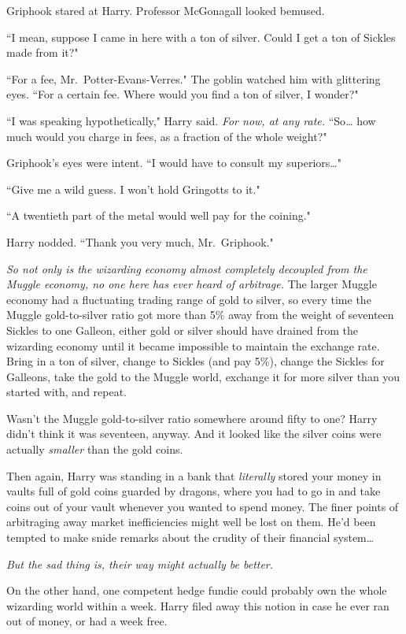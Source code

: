 Griphook stared at Harry. Professor McGonagall looked bemused.

``I mean, suppose I came in here with a ton of silver. Could I get a ton of Sickles made from it?"

``For a fee, Mr.~Potter-Evans-Verres." The goblin watched him with glittering eyes. ``For a certain fee. Where would you find a ton of silver, I wonder?"

``I was speaking hypothetically," Harry said. \emph{For now, at any rate.} ``So{\ldots} how much would you charge in fees, as a fraction of the whole weight?"

Griphook's eyes were intent. ``I would have to consult my superiors{\ldots}"

``Give me a wild guess. I won't hold Gringotts to it."

``A twentieth part of the metal would well pay for the coining."

Harry nodded. ``Thank you very much, Mr.~Griphook."

\emph{So not only is the wizarding economy almost completely decoupled from the Muggle economy, no one here has ever heard of arbitrage.} The larger Muggle economy had a fluctuating trading range of gold to silver, so every time the Muggle gold-to-silver ratio got more than 5\% away from the weight of seventeen Sickles to one Galleon, either gold or silver should have drained from the wizarding economy until it became impossible to maintain the exchange rate. Bring in a ton of silver, change to Sickles (and pay 5\%), change the Sickles for Galleons, take the gold to the Muggle world, exchange it for more silver than you started with, and repeat.

Wasn't the Muggle gold-to-silver ratio somewhere around fifty to one? Harry didn't think it was seventeen, anyway. And it looked like the silver coins were actually \emph{smaller} than the gold coins.

Then again, Harry was standing in a bank that \emph{literally} stored your money in vaults full of gold coins guarded by dragons, where you had to go in and take coins out of your vault whenever you wanted to spend money. The finer points of arbitraging away market inefficiencies might well be lost on them. He'd been tempted to make snide remarks about the crudity of their financial system{\ldots}

\emph{But the sad thing is, their way might actually be better.}

On the other hand, one competent hedge fundie could probably own the whole wizarding world within a week. Harry filed away this notion in case he ever ran out of money, or had a week free.

